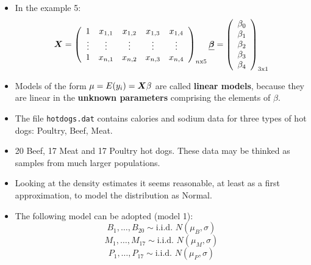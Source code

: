\begin{frame}
  \begin{itemize}
    \vspace{0.5cm}
    \item In the example 5: 
      $$ 
        \boldsymbol{X} = 
        \left(
          \begin{array}{ccccc} 
            1 & x_{1,1} & x_{1,2} & x_{1,3} & x_{1,4}\\
            \vdots & \vdots & \vdots & \vdots & \vdots\\
            1 & x_{n,1} & x_{n,2} & x_{n,3} & x_{n,4}\\
          \end{array}
        \right)_{n\text{x}5}
        \boldsymbol{\underline{\beta}} =
        \left(
          \begin{array}{c} 
            \beta_0 \\
            \beta_1 \\
            \beta_2 \\
            \beta_3 \\
            \beta_4 \\
          \end{array}
        \right)_{3\text{x}1}
      $$
    \vspace{0.5cm}
    \item Models of the form $ \mu = E(y_i) = \boldsymbol{X}\beta $ are called \textbf{linear models}, because they are linear in the \textbf{unknown parameters} comprising the elements of $ \beta $.
  \end{itemize}
\end{frame}



\begin{frame}
  \begin{itemize}
    \item The file \texttt{hotdogs.dat} contains calories and sodium data for three types of hot dogs: Poultry, Beef, Meat.
    \vspace{0.25cm}
    \item 20 Beef, 17 Meat and 17 Poultry hot dogs. These data may be thinked as samples from much larger populations.
    \vspace{0.25cm}
    \item Looking at the density estimates it seems reasonable, at least as a first approximation, to model the distribution as Normal.
    \vspace{0.25cm}
    \item The following model can be adopted (model 1):
      $$ B_1, \dots, B_{20} \sim \text{i.i.d. } N(\mu_B, \sigma) $$
      $$ M_1, \dots, M_{17} \sim \text{i.i.d. } N(\mu_M, \sigma) $$
      $$ P_1, \dots, P_{17} \sim \text{i.i.d. } N(\mu_P, \sigma) $$
  \end{itemize}
\end{frame}

